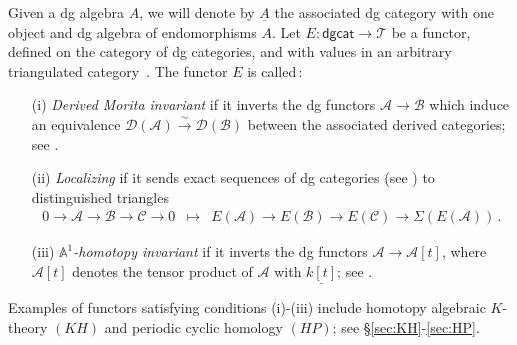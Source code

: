 \documentclass{amsart}
\numberwithin{equation}{subsection}
\theoremstyle{remark}
\theoremstyle{remark}
\theoremstyle{remark}
\theoremstyle{remark}
\begin{document}
Given a dg algebra $A$, we will denote by $\underline{A}$ the associated dg category with one object and dg algebra of endomorphisms $A$. Let $E: {\mathsf{dgcat}} \to {{\mathcal T}}$ be a functor, defined on the category of dg categories, and with values in an arbitrary triangulated category~\cite{Neeman}. The functor $E$ is called\,:
\begin{itemize}
\item[(i)] {\em Derived Morita invariant} if it inverts the dg functors ${{\mathcal A}} \to {{\mathcal B}}$ which induce an equivalence ${{\mathcal D}}({{\mathcal A}}) \stackrel{\sim}{\to}{{\mathcal D}}({{\mathcal B}})$ between the associated derived categories; see \cite[\S3]{ICM}.
\item[(ii)] {\em Localizing} if it sends exact sequences of dg categories (see \cite[\S4.6]{ICM})  
to distinguished triangles
\begin{eqnarray*}
0 \to {{\mathcal A}} \to {{\mathcal B}} \to {{\mathcal C}} \to 0 &\mapsto&
E({{\mathcal A}}) \to E({{\mathcal B}}) \to E({{\mathcal C}}) \to \Sigma(E({{\mathcal A}}))\,.
\end{eqnarray*}

\item[(iii)] {\em ${\mathbb{A}}^1$-homotopy invariant} if it inverts the dg functors ${{\mathcal A}} \to {{\mathcal A}}[t]$, where ${{\mathcal A}}[t]$ denotes the tensor product of ${{\mathcal A}}$ with $\underline{k[t]}$; see \cite[\S2.3]{ICM}.
\end{itemize}
Examples of functors satisfying conditions (i)-(iii) include homotopy algebraic $K$-theory $(KH)$ and periodic cyclic homology $(HP)$; see \S\ref{sec:KH}-\ref{sec:HP}.
\end{document}
